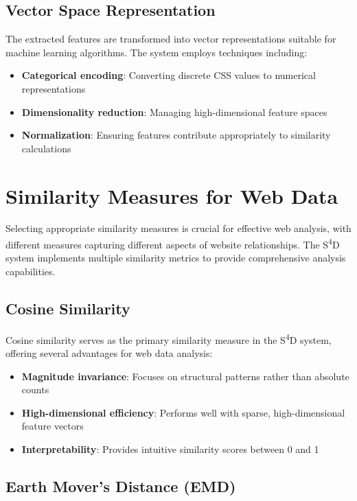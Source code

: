 \subsection{Vector Space Representation}

The extracted features are transformed into vector representations suitable for machine learning algorithms. The system employs techniques including:

\begin{itemize}
    \item \textbf{Categorical encoding}: Converting discrete CSS values to numerical representations
    \item \textbf{Dimensionality reduction}: Managing high-dimensional feature spaces
    \item \textbf{Normalization}: Ensuring features contribute appropriately to similarity calculations
\end{itemize}

\section{Similarity Measures for Web Data}
\label{sec:similarity-measures}

Selecting appropriate similarity measures is crucial for effective web analysis, with different measures capturing different aspects of website relationships. The S\textsuperscript{4}D system implements multiple similarity metrics to provide comprehensive analysis capabilities.

\subsection{Cosine Similarity}

Cosine similarity serves as the primary similarity measure in the S\textsuperscript{4}D system, offering several advantages for web data analysis:

\begin{itemize}
    \item \textbf{Magnitude invariance}: Focuses on structural patterns rather than absolute counts
    \item \textbf{High-dimensional efficiency}: Performs well with sparse, high-dimensional feature vectors
    \item \textbf{Interpretability}: Provides intuitive similarity scores between 0 and 1
\end{itemize}

\subsection{Earth Mover's Distance (EMD)}

